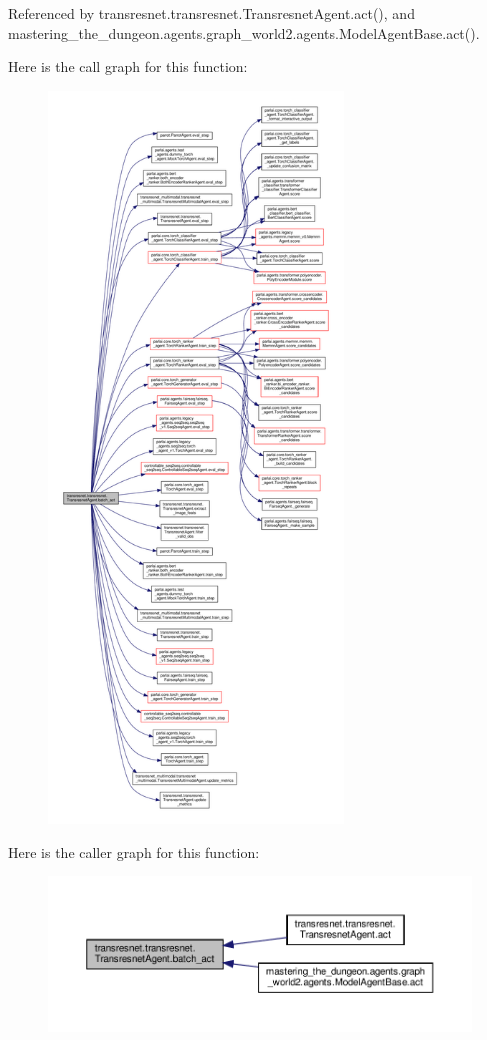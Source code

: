 Referenced by transresnet.\+transresnet.\+Transresnet\+Agent.\+act(), and mastering\+\_\+the\+\_\+dungeon.\+agents.\+graph\+\_\+world2.\+agents.\+Model\+Agent\+Base.\+act().

Here is the call graph for this function\+:
\nopagebreak
\begin{figure}[H]
\begin{center}
\leavevmode
\includegraphics[height=550pt]{classtransresnet_1_1transresnet_1_1TransresnetAgent_a5eadf6ccc4b1d15a520a70d111bff493_cgraph}
\end{center}
\end{figure}
Here is the caller graph for this function\+:
\nopagebreak
\begin{figure}[H]
\begin{center}
\leavevmode
\includegraphics[width=350pt]{classtransresnet_1_1transresnet_1_1TransresnetAgent_a5eadf6ccc4b1d15a520a70d111bff493_icgraph}
\end{center}
\end{figure}
